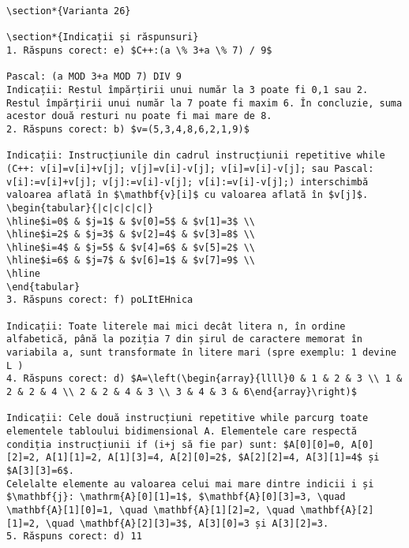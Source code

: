 \begin{verbatim}
\section*{Varianta 26}

\section*{Indicații și răspunsuri}
1. Răspuns corect: e) $C++:(a \% 3+a \% 7) / 9$

Pascal: (a MOD 3+a MOD 7) DIV 9
Indicații: Restul împărțirii unui număr la 3 poate fi 0,1 sau 2. Restul împărțirii unui număr la 7 poate fi maxim 6. În concluzie, suma acestor două resturi nu poate fi mai mare de 8.
2. Răspuns corect: b) $v=(5,3,4,8,6,2,1,9)$

Indicații: Instrucțiunile din cadrul instrucțiunii repetitive while (C++: v[i]=v[i]+v[j]; v[j]=v[i]-v[j]; v[i]=v[i]-v[j]; sau Pascal: v[i]:=v[i]+v[j]; v[j]:=v[i]-v[j]; v[i]:=v[i]-v[j];) interschimbă valoarea aflată în $\mathbf{v}[i]$ cu valoarea aflată în $v[j]$.
\begin{tabular}{|c|c|c|c|}
\hline$i=0$ & $j=1$ & $v[0]=5$ & $v[1]=3$ \\
\hline$i=2$ & $j=3$ & $v[2]=4$ & $v[3]=8$ \\
\hline$i=4$ & $j=5$ & $v[4]=6$ & $v[5]=2$ \\
\hline$i=6$ & $j=7$ & $v[6]=1$ & $v[7]=9$ \\
\hline
\end{tabular}
3. Răspuns corect: f) poLItEHnica

Indicații: Toate literele mai mici decât litera n, în ordine alfabetică, până la poziția 7 din șirul de caractere memorat în variabila a, sunt transformate în litere mari (spre exemplu: 1 devine L )
4. Răspuns corect: d) $A=\left(\begin{array}{llll}0 & 1 & 2 & 3 \\ 1 & 2 & 2 & 4 \\ 2 & 2 & 4 & 3 \\ 3 & 4 & 3 & 6\end{array}\right)$

Indicații: Cele două instrucțiuni repetitive while parcurg toate elementele tabloului bidimensional A. Elementele care respectă condiția instrucțiunii if (i+j să fie par) sunt: $A[0][0]=0, A[0][2]=2, A[1][1]=2, A[1][3]=4, A[2][0]=2$, $A[2][2]=4, A[3][1]=4$ și $A[3][3]=6$.
Celelalte elemente au valoarea celui mai mare dintre indicii i și $\mathbf{j}: \mathrm{A}[0][1]=1$, $\mathbf{A}[0][3]=3, \quad \mathbf{A}[1][0]=1, \quad \mathbf{A}[1][2]=2, \quad \mathbf{A}[2][1]=2, \quad \mathbf{A}[2][3]=3$, A[3][0]=3 și A[3][2]=3.
5. Răspuns corect: d) 11


\end{verbatim}
